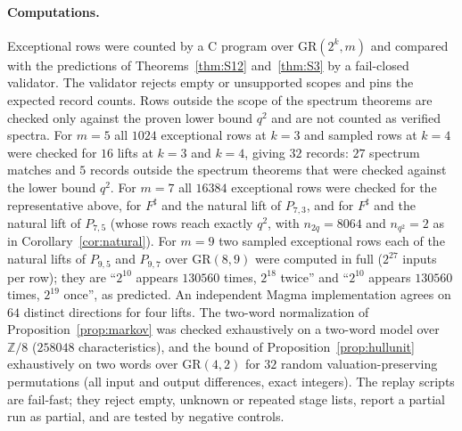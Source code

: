 \documentclass[11pt]{article}
\theoremstyle{definition}
\theoremstyle{remark}
\newcommand{\Z}{\mathbb{Z}}
\newcommand{\GR}{\mathrm{GR}}
\begin{document}
\paragraph{Computations.}
Exceptional rows were counted by a C program over $\GR(2^k,m)$ and compared with the predictions of
Theorems~\ref{thm:S12} and~\ref{thm:S3} by a fail-closed validator. The validator rejects empty or unsupported
scopes and pins the expected record counts. Rows outside the scope of the spectrum theorems are checked
only against the proven lower bound $q^2$ and are not counted as verified spectra. For $m=5$ all $1024$
exceptional rows at $k=3$ and sampled rows at $k=4$ were checked for $16$ lifts at $k=3$ and $k=4$, giving $32$ records: $27$ spectrum matches and $5$
records outside the spectrum theorems that were checked against the lower bound $q^2$. For $m=7$ all $16384$ exceptional rows were checked for the representative above,
for $F^\sharp$ and the natural lift of $P_{7,3}$, and for $F^\sharp$ and the natural lift of $P_{7,5}$ (whose rows
reach exactly $q^2$, with $n_{2q}=8064$ and $n_{q^2}=2$ as in Corollary~\ref{cor:natural}). For $m=9$ two sampled
exceptional rows each of the natural lifts of $P_{9,5}$ and $P_{9,7}$ over $\GR(8,9)$ were computed in full
($2^{27}$ inputs per row); they are ``$2^{10}$ appears $130560$ times, $2^{18}$ twice'' and ``$2^{10}$ appears $130560$
times, $2^{19}$ once'', as predicted. An independent Magma implementation agrees on $64$ distinct directions for four
lifts. The two-word normalization of Proposition~\ref{prop:markov} was checked exhaustively on a two-word model over
$\Z/8$ ($258048$ characteristics), and the bound of Proposition~\ref{prop:hullunit} exhaustively on two words over
$\GR(4,2)$ for $32$ random valuation-preserving permutations (all input and output differences, exact integers). The
replay scripts are fail-fast; they reject empty, unknown or repeated stage
lists, report a partial run as partial, and are tested by negative controls.
\end{document}
